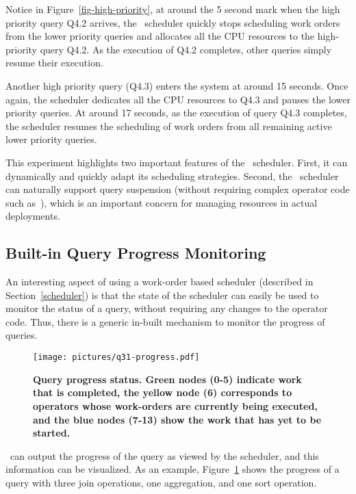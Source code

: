 Notice in Figure~\ref{fig-high-priority}, at around the 5 second mark when the high priority query Q4.2 arrives, the \Quickstep\ scheduler quickly stops scheduling work orders from the lower priority queries and allocates all the CPU resources to the high-priority query Q4.2.
As the execution of Q4.2 completes, other queries simply resume their execution.

Another high priority query (Q4.3) enters the system at around 15 seconds.
Once again, the scheduler dedicates all the CPU resources to Q4.3 and pauses the lower priority queries.
At around 17 seconds, as the execution of query Q4.3 completes, the scheduler resumes the scheduling of work orders from all remaining active lower priority queries.

This experiment highlights two important features of the \Quickstep\ scheduler.
First, it can dynamically and quickly adapt its scheduling strategies. %
Second, the \Quickstep\ scheduler can naturally support query suspension (without requiring complex operator code such as~\cite{DavisonG94}), which is an important concern for managing resources in actual deployments.

\subsection{Built-in Query Progress Monitoring}\label{sec:progress-monitoring}
An interesting aspect of using a work-order based scheduler (described in Section~\ref{scheduler}) is that the state of the scheduler can easily be used to monitor the status of a query, without requiring any changes to the operator code. Thus, there is a generic in-built mechanism to monitor the progress of queries.

\begin{figure}[thb]
\centering
   \texttt{[image: pictures/q31-progress.pdf]}
   \caption{\small \textbf{Query progress status. Green nodes (0-5) indicate work that is completed, the yellow node (6) corresponds to operators whose work-orders are currently being executed, and the blue nodes (7-13) show the work that has yet to be started.}}
   \label{fig-query-progress}
\end{figure}


\Quickstep\ can output the progress of the query as viewed by the scheduler, and this information can be visualized. As an example, Figure~\ref{fig-query-progress} shows the progress of a query with three join operations, one aggregation, and one sort operation.

